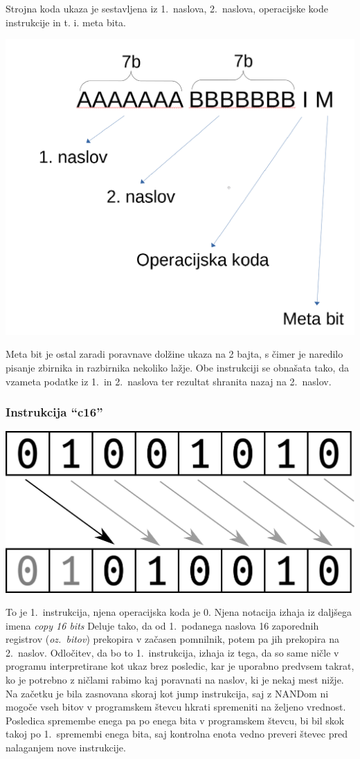 \documentclass[12pt]{article}
\begin{document}
Strojna koda ukaza je sestavljena iz 1.\ naslova, 2.\ naslova, operacijske kode instrukcije in t. i. meta bita.

\begin{center}
  \includegraphics[width=.3\linewidth]{slike/zločinski_posnetek_zaslona.png}
\end{center}

Meta bit je ostal zaradi poravnave dolžine ukaza na 2 bajta, s čimer je naredilo pisanje zbirnika in razbirnika nekoliko lažje.
Obe instrukciji se obnašata tako, da vzameta podatke iz 1.\ in 2.\ naslova ter rezultat shranita nazaj na 2.\ naslov.
\pagebreak
\subsubsection{Instrukcija ``c16''}

\begin{center}
  \includegraphics[width=.3\linewidth]{slike/predstavitev/copy.png}
\end{center}

To je 1.\ instrukcija, njena operacijska koda je $0$.
Njena notacija izhaja iz daljšega imena \textit{copy 16 bits}
Deluje tako, da od 1.\ podanega naslova 16 zaporednih registrov (\textit{oz.\ bitov}) prekopira v začasen pomnilnik, potem pa jih prekopira na 2.\ naslov.
Odločitev, da bo to 1.\ instrukcija, izhaja iz tega, da so same ničle v programu interpretirane kot ukaz brez posledic, kar je uporabno predvsem takrat, ko je potrebno z ničlami rabimo kaj poravnati na naslov, ki je nekaj mest nižje.
Na začetku je bila zasnovana skoraj kot jump instrukcija, saj z NANDom ni mogoče vseh bitov v programskem števcu hkrati spremeniti na željeno vrednost.
Posledica spremembe enega pa po enega bita v programskem števcu, bi bil skok takoj po 1.\ spremembi enega bita, saj kontrolna enota vedno preveri števec pred nalaganjem nove instrukcije.
\end{document}
